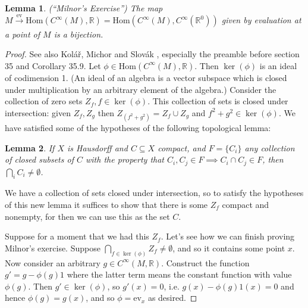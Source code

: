 \documentclass[12pt]{article}
\newcommand{\Hom}{\mathrm{Hom}}
\newcommand{\rr}{\ensuremath{\mathbb{R}}}
\newcommand{\cinfty}{\ensuremath{C^{\infty}}}
\newtheorem{mylemma}{Lemma}
\begin{document}
\begin{mylemma}\label{lemma:smoothfact1}(``Milnor's Exercise'') The map $M\xrightarrow[]{\mathrm{ev}}\Hom(\cinfty(M),\rr)=\Hom(\cinfty(M),\cinfty(\rr^0))$ given by evaluation at a point of $M$ is a bijection.
\end{mylemma}
\begin{proof}
See also Kolář, Michor and Slovák \cite{kolar_natural_1993}, especially the preamble before section 35 and Corollary 35.9. Let $\phi\in\Hom(\cinfty(M), \rr)$. Then $\ker(\phi)$ is an ideal of codimension 1. (An ideal of an algebra is a vector subspace which is closed under multiplication by an arbitrary element of the algebra.) Consider the collection of zero sets $Z_f, f\in \ker(\phi)$. This collection of sets is closed under intersection: given $Z_f, Z_g$ then $Z_{(f^2+g^2)} = Z_f\cup Z_g$ and $f^2+g^2\in\ker(\phi)$. We have satisfied some of the hypotheses of the following topological lemma:

\begin{mylemma}If $X$ is Hausdorff and $C\subseteq X$ compact, and $F=\{C_i\}$ any collection of closed subsets of $C$ with the property that $C_i, C_j\in F\implies C_i\cap C_j\in F$, then $\bigcap_i C_i \neq\emptyset$.\end{mylemma}

We have a collection of sets closed under intersection, so to satisfy the hypotheses of this new lemma it suffices to show that there is some $Z_f$ compact and nonempty, for then we can use this as the set $C$.

Suppose for a moment that we had this $Z_f$. Let's see how we can finish proving Milnor's exercise. Suppose $\bigcap_{f\in\ker(\phi)}Z_f\neq\emptyset$, and so it contains some point $x$. Now consider an arbitrary $g\in\cinfty(M,\rr)$. Construct the function $g'=g-\phi(g)1$ where the latter term means the constant function with value $\phi(g)$. Then $g'\in\ker(\phi)$, so $g'(x)=0$, i.e. $g(x)-\phi(g)1(x)=0$ and hence $\phi(g)=g(x)$, and so $\phi=\mathrm{ev}_x$ as desired.


\end{proof}
\end{document}
